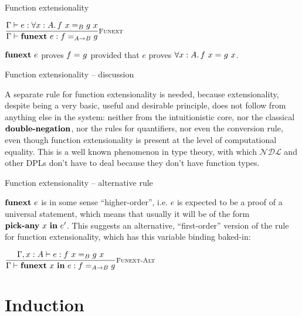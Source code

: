 \documentclass{beamer}
\newcommand{\NDL}{\mathcal{NDL}}
\begin{document}
\begin{frame}{Function extensionality}

\begin{center}
  $\infrule[Funext]{\proves{e}{\All{x}[A]{\Eq[B]{\app{f}{x}}{\app{g}{x}}}}}{\proves{\funext{e}}{\Eq[\Fun{A}{B}]{f}{g}}}$
\end{center}

\vspace{2em}

$\textbf{funext}\ e$ proves $f =_{} g$ provided that $e$ proves $\All{x}[A]{\Eq{\app{f}{x}}{\app{g}{x}}}$.

\end{frame}

\begin{frame}{Function extensionality -- discussion}

A separate rule for function extensionality is needed, because extensionality, despite being a very basic, useful and desirable principle, does not follow from anything else in the system: neither from the intuitionistic core, nor the classical $\dn$, nor the rules for quantifiers, nor even the conversion rule, even though function extensionality is present at the level of computational equality. This is a well known phenomenon in type theory, with which $\NDL$ and other DPLs don't have to deal because they don't have function types.

\end{frame}

\begin{frame}{Function extensionality -- alternative rule}

$\textbf{funext}\ e$ is in some sense ``higher-order'', i.e. $e$ is expected to be a proof of a universal statement, which means that usually it will be of the form $\allintro{x}{e'}$. This suggests an alternative, ``first-order'' version of the rule for function extensionality, which has this variable binding baked-in:

\vspace{2em}

\begin{center}
  $\infrule[Funext-Alt]{\proves[\extend{\Gamma}{x}{A}]{e}{\Eq[B]{\app{f}{x}}{\app{g}{x}}}}{\proves{\funextalt{x}{e}}{\Eq[\Fun{A}{B}]{f}{g}}}$
\end{center}

\end{frame}

\section{Induction}
\end{document}
